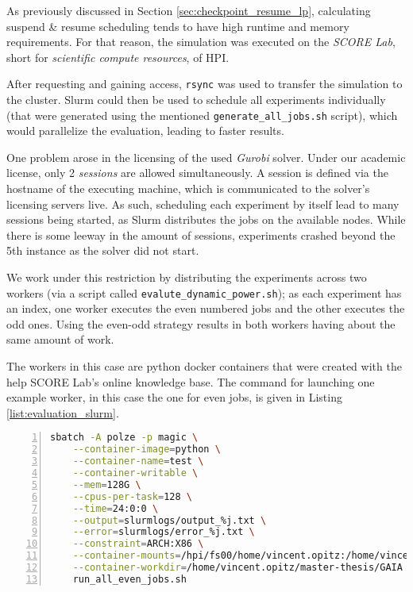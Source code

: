 As previously discussed in Section \ref{sec:checkpoint_resume_lp}, calculating suspend \& resume scheduling tends to have high runtime and memory requirements. 
For that reason, the simulation was executed on the \emph{SCORE Lab}, short for \emph{scientific compute resources}, of HPI.

After requesting and gaining access, \verb|rsync| was used to transfer the simulation to the cluster. 
Slurm could then be used to schedule all experiments individually (that were generated using the mentioned \verb|generate_all_jobs.sh| script), which would parallelize the evaluation, leading to faster results.

One problem arose in the licensing of the used \emph{Gurobi} solver. 
Under our academic license, only 2 \emph{sessions} are allowed simultaneously.
A session is defined via the hostname of the executing machine, which is communicated to the solver's licensing servers live.
As such, scheduling each experiment by itself lead to many sessions being started, as Slurm distributes the jobs on the available nodes.
While there is some leeway in the amount of sessions, experiments crashed beyond the 5th instance as the solver did not start.

We work under this restriction by distributing the experiments across two workers (via a script called \verb|evalute_dynamic_power.sh|); as each experiment has an index, one worker executes the even numbered jobs and the other executes the odd ones. 
Using the even-odd strategy results in both workers having about the same amount of work.

The workers in this case are python docker containers that were created with the help SCORE Lab's online knowledge base.
The command for launching one example worker, in this case the one for even jobs, is given in Listing \ref{list:evaluation_slurm}.

\begin{lstlisting}[language=bash, frame=single, numbers=left, caption={Executing the Evaluation inside the SCORE Lab's Slurm environment}, label={list:evaluation_slurm}, basicstyle=\ttfamily]
sbatch -A polze -p magic \
    --container-image=python \
    --container-name=test \
    --container-writable \
    --mem=128G \
    --cpus-per-task=128 \
    --time=24:0:0 \
    --output=slurmlogs/output_%j.txt \
    --error=slurmlogs/error_%j.txt \
    --constraint=ARCH:X86 \
    --container-mounts=/hpi/fs00/home/vincent.opitz:/home/vincent.opitz \
    --container-workdir=/home/vincent.opitz/master-thesis/GAIA \
    run_all_even_jobs.sh
 \end{lstlisting}

